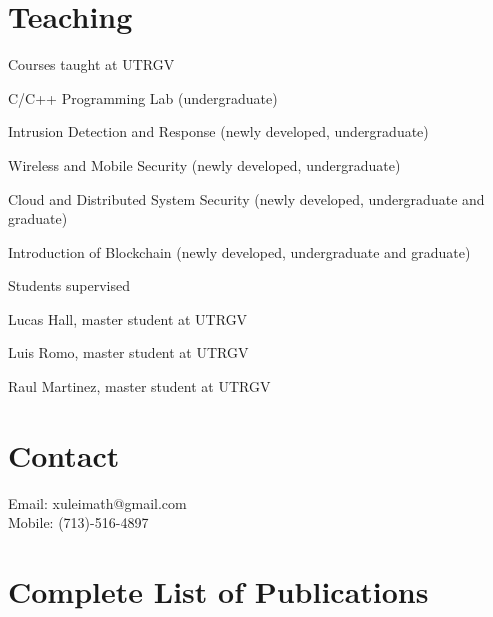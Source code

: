\section*{Teaching}
\begin{compactitem}
    \item Courses taught at UTRGV
        \begin{compactitem}
            \item C/C++ Programming Lab (undergraduate)
            \item Intrusion Detection and Response (newly developed, undergraduate)
            \item Wireless and Mobile Security (newly developed, undergraduate)
            \item Cloud and Distributed System Security (newly developed, undergraduate and graduate)
            \item Introduction of Blockchain (newly developed, undergraduate and graduate)
        \end{compactitem}
    \item Students supervised
        \begin{compactitem}
            \item Lucas Hall, master student at UTRGV
            \item Luis Romo, master student at UTRGV
            \item Raul Martinez, master student at UTRGV
        \end{compactitem}   
\end{compactitem}

\section*{Contact}
Email: xuleimath@gmail.com\\
Mobile: (713)-516-4897

\section*{Complete List of Publications}

\begin{enumerate}[{[1]}, nosep]
    \item {}
    \item {}
    \item {}
    \item {}
    \item {}
    \item {}
    \item {}
    \item {}
\end{enumerate}
